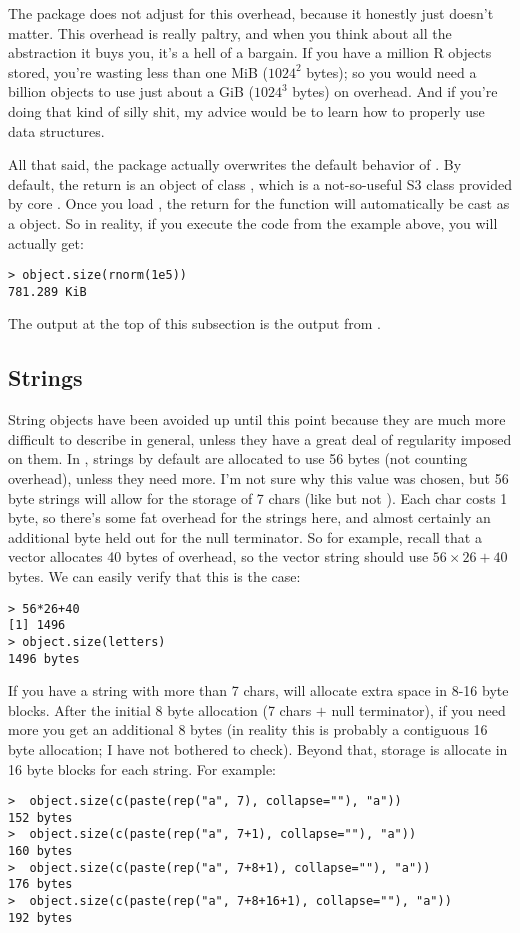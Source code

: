 The  package does not adjust for this overhead, because it 
honestly just doesn't matter.  This overhead is really paltry, and when you 
think about all the abstraction it buys you, it's a hell of a bargain.  If you 
have a million R objects stored, you're wasting less than one MiB ($1024^2$ 
bytes); so you would need a billion objects to use just about a GiB ($1024^3$ 
bytes) on overhead.  And if you're doing that kind of silly shit, my advice 
would be to learn how to properly use data structures.

All that said, the  package actually overwrites the default 
behavior of .  By default, the return is an object of class 
, which is a not-so-useful S3 class provided by core 
\R.  Once you load , the return for the 
 function will automatically be cast as a  
object.  So in reality, if you execute the code from the example above, you 
will actually get:
\begin{lstlisting}[language=rr]
> object.size(rnorm(1e5))
781.289 KiB
\end{lstlisting}
The output at the top of this subsection is the output from 
.


\subsection{Strings}

String objects have been avoided up until this point because they are much more 
difficult to describe in general, unless they have a great deal of regularity 
imposed on them.  In \R, strings by default are allocated to use 56 
bytes (not counting overhead), unless they need more.  I'm not sure why this 
value was chosen, but 56 byte strings will allow for the storage of 7 chars 
(like  but not ).  Each char costs 1 byte, so there's some fat 
overhead for the strings here, and almost certainly an additional byte held out 
for the null terminator.  So for example, recall that a vector allocates 40 
bytes of overhead, so the vector string  should use $56\times 26 + 
40$ bytes.  We can easily verify that this is the case:
\begin{lstlisting}[language=rr]
> 56*26+40
[1] 1496
> object.size(letters)
1496 bytes
\end{lstlisting}

If you have a string with more than 7 chars, \R will allocate extra 
space in 8-16 byte blocks.  After the initial 8 byte allocation (7 chars $+$ 
null terminator), if you need more you get an additional 8 bytes (in reality 
this is probably a contiguous 16 byte allocation; I have not bothered to check). 
 Beyond that, storage is allocate in 16 byte blocks for each string.  For 
example:
\begin{lstlisting}[language=rr]
>  object.size(c(paste(rep("a", 7), collapse=""), "a")) 
152 bytes
>  object.size(c(paste(rep("a", 7+1), collapse=""), "a")) 
160 bytes
>  object.size(c(paste(rep("a", 7+8+1), collapse=""), "a")) 
176 bytes
>  object.size(c(paste(rep("a", 7+8+16+1), collapse=""), "a")) 
192 bytes
\end{lstlisting}

